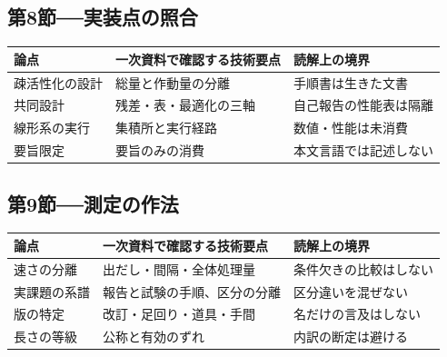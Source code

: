 \documentclass[lualatex,a4paper,10pt]{jlreq}
\begin{document}
\subsection*{第8節──実装点の照合}
\begin{tabularx}{\textwidth}{@{}>{\raggedright\arraybackslash}p{}>{\raggedright\arraybackslash}p{}>{\raggedright\arraybackslash}X@{}}
\toprule
論点 & 一次資料で確認する技術要点 & 読解上の境界 \\
\midrule
疎活性化の設計 & 総量と作動量の分離 & 手順書は生きた文書 \\
共同設計 & 残差・表・最適化の三軸 & 自己報告の性能表は隔離 \\
線形系の実行 & 集積所と実行経路 & 数値・性能は未消費 \\
要旨限定 & 要旨のみの消費 & 本文言語では記述しない \\
\bottomrule
\end{tabularx}
\autocite{v41report,qwen38next,kimigithub,glm5report}
\normalsize

\subsection*{第9節──測定の作法}
\begin{tabularx}{\textwidth}{@{}>{\raggedright\arraybackslash}p{}>{\raggedright\arraybackslash}p{}>{\raggedright\arraybackslash}X@{}}
\toprule
論点 & 一次資料で確認する技術要点 & 読解上の境界 \\
\midrule
速さの分離 & 出だし・間隔・全体処理量 & 条件欠きの比較はしない \\
実課題の系譜 & 報告と試験の手順、区分の分離 & 区分違いを混ぜない \\
版の特定 & 改訂・足回り・道具・手間 & 名だけの言及はしない \\
長さの等級 & 公称と有効のずれ & 内訳の断定は避ける \\
\bottomrule
\end{tabularx}
\autocite{swebench,swepro,tbench,ruler,mlperf}
\normalsize

\end{document}

